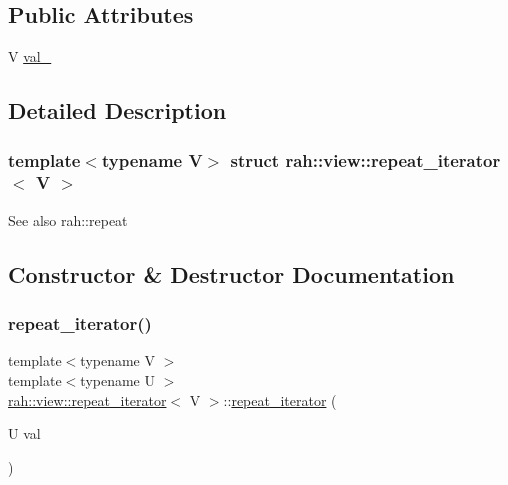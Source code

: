 \subsection*{Public Attributes}
\begin{DoxyCompactItemize}
\item 
V \mbox{\hyperlink{structrah_1_1view_1_1repeat__iterator_a6286ca38cb848630cb870dc6ab42eb79}{val\+\_\+}}
\end{DoxyCompactItemize}


\subsection{Detailed Description}
\subsubsection*{template$<$typename V$>$\newline
struct rah\+::view\+::repeat\+\_\+iterator$<$ V $>$}

\begin{DoxySeeAlso}{See also}
rah\+::repeat 
\end{DoxySeeAlso}


\subsection{Constructor \& Destructor Documentation}
\mbox{\label{structrah_1_1view_1_1repeat__iterator_af91bc578d1fe7d90373896abc8e56546}} 
\subsubsection{\texorpdfstring{repeat\_iterator()}{repeat\_iterator()}\hspace{0.1cm}{\footnotesize\ttfamily [1/2]}}
{\footnotesize\ttfamily template$<$typename V $>$ \\
template$<$typename U $>$ \\
\mbox{\hyperlink{structrah_1_1view_1_1repeat__iterator}{rah\+::view\+::repeat\+\_\+iterator}}$<$ V $>$\+::\mbox{\hyperlink{structrah_1_1view_1_1repeat__iterator}{repeat\+\_\+iterator}} (\begin{DoxyParamCaption}\item[{U}]{val }\end{DoxyParamCaption})\hspace{0.3cm}{\ttfamily [inline]}}

